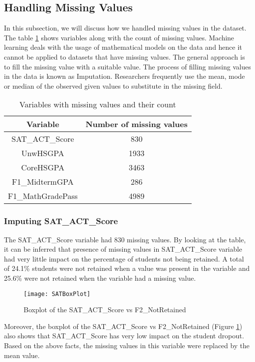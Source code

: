 \documentclass[11pt,openright]{report}
\begin{document}
\subsection {Handling Missing Values}
In this subsection, we will discuss how we handled missing values in the dataset. The table \ref{table:missing_db} shows variables along with the count of missing values. Machine learning deals with the usage of mathematical models on the data and hence it cannot be applied to datasets that have missing values. The general approach is to fill the missing value with a suitable value. The process of filling missing values in the data is known as Imputation. Researchers frequently use the mean, mode or median of the observed given values to substitute in the missing field.
 \begin{table}[!t]
	\renewcommand{\arraystretch}{1.3}
	\caption{Variables with missing values and their count}
	\label{table:missing_db}
	\centering
	\begin{tabular}{|c|c|}
		\hline
		\bfseries Variable & \bfseries Number of missing values \\
		\hline
		SAT\_ACT\_Score & 830\\ \hline
		UnwHSGPA & 1933\\ \hline
		CoreHSGPA & 3463\\ \hline
		F1\_MidtermGPA & 286\\ \hline
		F1\_MathGradePass & 4989\\ \hline
	\end{tabular}
\end{table}

\subsubsection {Imputing SAT\_ACT\_Score}
The SAT\_ACT\_Score variable had 830 missing values. By looking at the table, it can be inferred that presence of missing values in SAT\_ACT\_Score variable had very little impact on the percentage of students not being retained. A total of 24.1\% students were not retained when a value was present in the variable and 25.6\% were not retained when the variable had a missing value.

\begin{figure}[!htbp]
	\centering
	\texttt{[image: SATBoxPlot]}
	\caption{Boxplot of the SAT\_ACT\_Score vs F2\_NotRetained}
	\label{fig:Sat_F2NotRetained_plot}
\end{figure}

Moreover, the boxplot of the SAT\_ACT\_Score vs F2\_NotRetained (Figure \ref{fig:Sat_F2NotRetained_plot}) also shows that SAT\_ACT\_Score has very low impact on the student dropout. Based on the above facts, the missing values in this variable were replaced by the mean value. 
\end{document}
